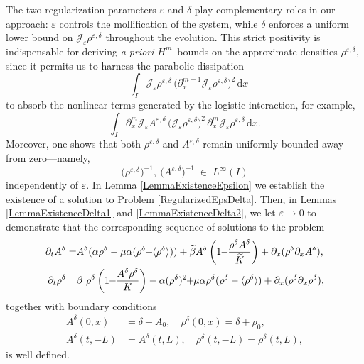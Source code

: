\documentclass[12pt]{amsart}
\newcommand{\Jrho}{\mathcal{J_\varepsilon}\rho^{\varepsilon,\delta}}
\newcommand{\JA}{\mathcal{J_\varepsilon}A^{\varepsilon,\delta}}
\begin{document}
	    The two regularization parameters $\varepsilon$ and $\delta$ play complementary roles in our approach: $\varepsilon$ controls the mollification of the system, while $\delta$ enforces a uniform lower bound on $\Jrho$ throughout the evolution. This strict positivity is indispensable for deriving \emph{a priori} $H^m$–bounds on the approximate densities $\rho^{\varepsilon,\delta}$, since it permits us to harness the parabolic dissipation
\[
- \int_I \Jrho \,\bigl(\partial_x^{m+1}\Jrho\bigr)^2 \,\mathrm{d}x
\]
to absorb the nonlinear terms generated by the logistic interaction, for example,
\[
\int_I \partial_x^m \JA \,\bigl(\Jrho\bigr)^2\,\partial_x^m\Jrho \,\mathrm{d}x.
\]
Moreover, one shows that both $\rho^{\varepsilon,\delta}$ and $A^{\varepsilon,\delta}$ remain uniformly bounded away from zero—namely,
\[
\bigl(\rho^{\varepsilon,\delta}\bigr)^{-1},\ \bigl(A^{\varepsilon,\delta}\bigr)^{-1}\;\in\;L^\infty(I)
\]
independently of $\varepsilon$.
	In Lemma \ref{LemmaExistenceEpsilon} we establish the existence of a solution to Problem \eqref{RegularizedEpsDelta}. Then, in Lemmas \ref{LemmaExistenceDelta1} and \ref{LemmaExistenceDelta2}, we let $\varepsilon\to0$ to demonstrate that the corresponding sequence of solutions 
 to the problem
	\begin{equation}\label{RegularizedDelta}
			\begin{aligned}
			\partial_t A^\delta=&  A^\delta(\alpha\rho^\delta-\mu\alpha(\rho^\delta\hspace{-0,1cm}-\hspace{-0,1cm}\langle \rho^\delta \rangle))+\widetilde{\beta}A^\delta\left(1\hspace{-0,1cm}-\hspace{-0,1cm}\frac{\rho^\delta A^\delta}{\widetilde{K}} \right)+\partial_x(\rho^\delta \partial_x A^\delta), \\
			\partial_t\rho^\delta=&\beta\ \rho^\delta\left(1\hspace{-0,1cm}-\hspace{-0,1cm}\frac{A^\delta\rho^\delta}{K} \right)-\alpha(\rho^\delta)^2
			\hspace{-0,1cm}+\hspace{-0,1cm}\mu\alpha\rho^\delta(\rho^\delta-\langle \rho^\delta\rangle)+\partial_x(\rho^\delta \partial_{x}\rho^\delta),
            \end{aligned}
	\end{equation}
    together with boundary conditions
    \begin{equation}
\begin{split}
			A^\delta(0,x)&=\delta+A_0,\quad\rho^\delta(0,x)=\delta+\rho_0,\\ A^\delta(t,-L)&=A^\delta(t,L),\quad\rho^\delta(t,-L)=\rho^\delta(t,L) ,
		\end{split}
	\end{equation}
	is well defined.
	
\end{document}
